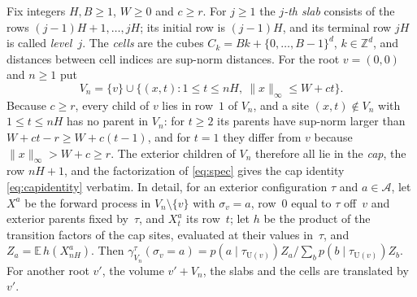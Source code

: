 \documentclass[11pt]{article}
\theoremstyle{plain}
\theoremstyle{definition}
\theoremstyle{remark}
\newcommand{\A}{\mathcal{A}}
\newcommand{\Z}{\mathbb{Z}}
\newcommand{\E}{\mathbb{E}}
\newcommand{\Ue}{\mathrm{U}}
\begin{document}
Fix integers $H,B\ge1$, $W\ge0$ and $c\ge r$. For $j\ge1$ the \emph{$j$-th slab} consists of the rows $(j-1)H+1,\dots,jH$; its initial row is $(j-1)H$, and its terminal row $jH$ is called \emph{level~$j$}. The \emph{cells} are the cubes $C_k=Bk+\{0,\dots,B-1\}^d$, $k\in\Z^d$, and distances between cell indices are sup-norm distances. For the root $v=(0,0)$ and $n\ge1$ put
\begin{equation}
V_n=\{v\}\cup\bigl\{(x,t):1\le t\le nH,\ \|x\|_\infty\le W+ct\bigr\}.
\label{eq:Vnd}
\end{equation}
Because $c\ge r$, every child of $v$ lies in row~$1$ of $V_n$, and a site $(x,t)\notin V_n$ with $1\le t\le nH$ has no parent in $V_n$: for $t\ge2$ its parents have sup-norm larger than $W+ct-r\ge W+c(t-1)$, and for $t=1$ they differ from $v$ because $\|x\|_\infty>W+c\ge r$. The exterior children of $V_n$ therefore all lie in the \emph{cap}, the row $nH+1$, and the factorization of \eqref{eq:spec} gives the cap identity \eqref{eq:capidentity} verbatim. In detail, for an exterior configuration $\tau$ and $a\in\A$, let $X^a$ be the forward process in $V_n\setminus\{v\}$ with $\sigma_v=a$, row~$0$ equal to $\tau$ off~$v$ and exterior parents fixed by~$\tau$, and $X^a_t$ its row~$t$; let $h$ be the product of the transition factors of the cap sites, evaluated at their values in~$\tau$, and $Z_a=\E\,h(X^a_{nH})$. Then $\gamma^\tau_{V_n}(\sigma_v=a)=p(a\mid\tau_{\Ue(v)})Z_a/\sum_bp(b\mid\tau_{\Ue(v)})Z_b$. For another root $v'$, the volume $v'+V_n$, the slabs and the cells are translated by~$v'$.
\end{document}
